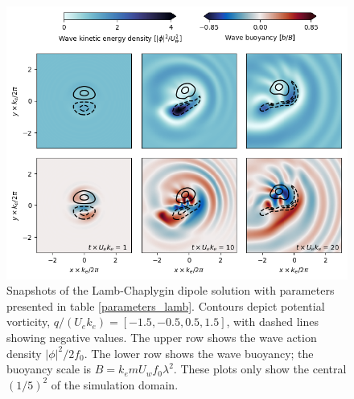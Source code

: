 \documentclass{jfm}
\begin{document}
\begin{figure}
\centering
\includegraphics[width=.925\textwidth]{figs/fig1.png}
\caption{Snapshots of the Lamb-Chaplygin dipole solution with parameters presented
          in table \ref{parameters_lamb}.
        Contours depict potential vorticity, $q / (U_e k_e) = [
        -1.5,-0.5,0.5,1.5]$, with dashed lines showing negative values. The upper row shows the wave action density $|\phi|^2/2f_0$. The lower row shows the wave buoyancy;
        the buoyancy scale is $B = k_e m U_w f_0 \lambda^2$.
        These plots only show the central $(1/5)^2$
        of the simulation domain.}
        \label{snaps_lamb}
\end{figure}
\end{document}
